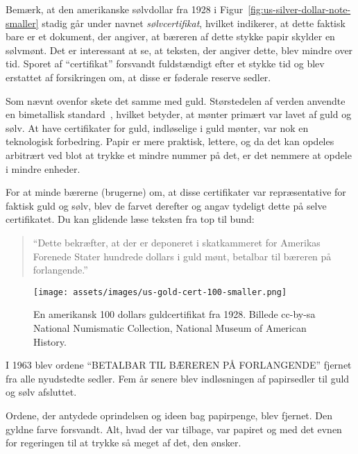 Bemærk, at den amerikanske sølvdollar fra 1928 i
Figur~\ref{fig:us-silver-dollar-note-smaller} stadig går under navnet
\textit{sølvcertifikat}, hvilket indikerer, at dette faktisk bare er et 
dokument, der angiver, at bæreren af dette stykke papir skylder en sølvmønt. 
Det er interessant at se, at teksten, der angiver dette, blev mindre over tid. 
Sporet af \enquote{certifikat} forsvandt fuldstændigt efter et stykke tid og 
blev erstattet af forsikringen om, at disse er føderale reserve sedler.

Som nævnt ovenfor skete det samme med guld. Størstedelen af verden anvendte en
bimetallisk standard~\cite{wiki:bimetallism}, hvilket betyder, at mønter primært
var lavet af guld og sølv. At have certifikater for guld, indløselige i
guld mønter, var nok en teknologisk forbedring. Papir er mere praktisk,
lettere, og da det kan opdeles arbitrært ved blot at trykke et mindre
nummer på det, er det nemmere at opdele i mindre enheder.

For at minde bærerne (brugerne) om, at disse certifikater var
repræsentative for faktisk guld og sølv, blev de farvet derefter
og angav tydeligt dette på selve certifikatet. Du kan glidende læse
teksten fra top til bund:

\begin{quotation}\begin{samepage}
  \enquote{Dette bekræfter, at der er deponeret i skatkammeret for
  Amerikas Forenede Stater hundrede dollars i guld mønt, betalbar til
  bæreren på forlangende.}
\end{samepage}\end{quotation}
  
\begin{figure}[htbp]
  \centering
  \texttt{[image: assets/images/us-gold-cert-100-smaller.png]}
  \caption{En amerikansk 100 dollars guldcertifikat fra 1928. 
  Billede cc-by-sa National Numismatic Collection, National Museum of American
  History.}
  \label{fig:us-gold-cert-100-smaller}
\end{figure}

I 1963 blev ordene \enquote{BETALBAR TIL BÆREREN PÅ FORLANGENDE} fjernet fra
alle nyudstedte sedler. Fem år senere blev indløsningen af papirsedler
til guld og sølv afsluttet.

Ordene, der antydede oprindelsen og ideen bag papirpenge, blev
fjernet. Den gyldne farve forsvandt. Alt, hvad der var tilbage, var papiret
og med det evnen for regeringen til at trykke så meget af det, den ønsker.

